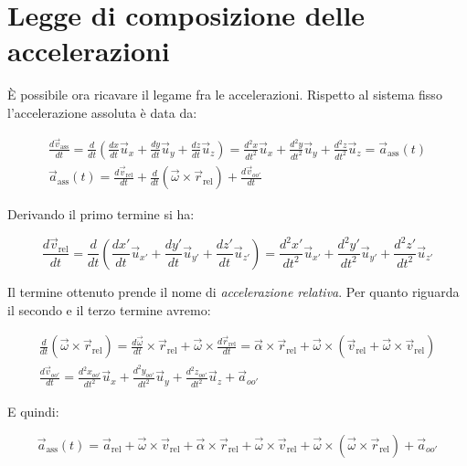 \begin{figure}[htpb]
\end{figure}

\section{Legge di composizione delle accelerazioni}

È possibile ora ricavare il legame fra le accelerazioni. Rispetto al sistema fisso l'accelerazione assoluta è data da:

\begin{gather*}
	\frac{d\vec{v}_{\text{ass} }}{dt}=\frac{d}{dt}\left(\frac{dx}{dt} \vec{u}_x + \frac{dy}{dt} \vec{u}_y+ \frac{dz}{dt} \vec{u}_z\right)=\frac{d^2x}{dt^2} \vec{u}_x+ \frac{d^2y}{dt^2} \vec{u}_y+\frac{d^2z}{dt^2} \vec{u}_z=\vec{a}_{\text{ass}} (t) \\
	\vec{a}_{\text{ass}}(t)=\frac{d\vec{v}_{\text{rel}}}{dt}+\frac{d}{dt}(\vec{\omega} \times \vec{r}_{\text{rel}})+\frac{d\vec{v}_{oo'}}{dt}
\end{gather*}

Derivando il primo termine si ha:

\[
	\frac{d\vec{v}_{\text{rel}}}{dt}=\frac{d}{dt}\left(\frac{dx'}{dt}\vec{u}_{x'}+\frac{dy'}{dt}\vec{u}_{y'}+\frac{dz'}{dt}\vec{u}_{z'}\right)=\frac{d^2x'}{dt^2} \vec{u}_{x'} + \frac{d^2y'}{dt^2} \vec{u}_{y'}+ \frac{d^2z'}{dt^2} \vec{u}_{z'}
\]

Il termine ottenuto prende il nome di \emph{accelerazione relativa}. Per quanto riguarda il secondo e il terzo termine avremo:

\begin{gather*}
	\frac{d}{dt}(\vec{\omega} \times \vec{r}_{\text{rel}})=\frac{d\vec{\omega}}{dt} \times \vec{r}_{\text{rel}}+\vec{\omega} \times \frac{d\vec{r}_{\text{rel}} }{dt} = \vec{\alpha} \times \vec{r}_{\text{rel}}+\vec{\omega} \times( \vec{v}_{\text{rel}}+\vec{\omega} \times \vec{v}_{\text{rel}}) \\
	\frac{d\vec{v}_{oo'}}{dt}= \frac{d^2x_{oo'}}{dt^2} \vec{u}_x+ \frac{d^2y_{oo'}}{dt^2} \vec{u}_y+ \frac{d^2z_{oo'}}{dt^2} \vec{u}_z+\vec{a}_{oo'}
\end{gather*}

E quindi:

\[
	\vec{a}_{\text{ass}}(t)=\vec{a}_{\text{rel}} +\vec{\omega} \times \vec{v}_{\text{rel}}+\vec{\alpha}\times \vec{r}_{\text{rel}}+\vec{\omega} \times \vec{v}_{\text{rel}}+ \vec{\omega}\times({\vec{\omega}}\times \vec{r}_{\text{rel}})+\vec{a}_{oo'}
\]

